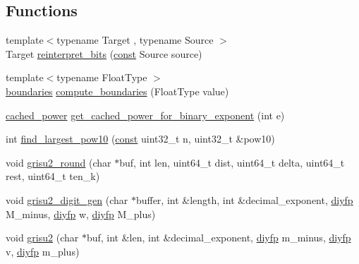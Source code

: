 \subsection*{Functions}
\begin{DoxyCompactItemize}
\item 
{\footnotesize template$<$typename Target , typename Source $>$ }\\Target \hyperlink{namespacenlohmann_1_1detail_1_1dtoa__impl_a1c5d30eb51e5e994a3f48bde104d2ce8}{reinterpret\+\_\+bits} (\hyperlink{functions__c_8js_afacfd9c985d225bb07483b887a801b6f}{const} Source source)
\item 
{\footnotesize template$<$typename Float\+Type $>$ }\\\hyperlink{structnlohmann_1_1detail_1_1dtoa__impl_1_1boundaries}{boundaries} \hyperlink{namespacenlohmann_1_1detail_1_1dtoa__impl_a22b6e37654ac93c6d0d9c06ec1bf5ded}{compute\+\_\+boundaries} (Float\+Type value)
\item 
\hyperlink{structnlohmann_1_1detail_1_1dtoa__impl_1_1cached__power}{cached\+\_\+power} \hyperlink{namespacenlohmann_1_1detail_1_1dtoa__impl_adbf329a18c5cf854a3477327afd2200b}{get\+\_\+cached\+\_\+power\+\_\+for\+\_\+binary\+\_\+exponent} (int e)
\item 
int \hyperlink{namespacenlohmann_1_1detail_1_1dtoa__impl_a264df2b5a7e19b864859161f3501155e}{find\+\_\+largest\+\_\+pow10} (\hyperlink{functions__c_8js_afacfd9c985d225bb07483b887a801b6f}{const} uint32\+\_\+t n, uint32\+\_\+t \&pow10)
\item 
void \hyperlink{namespacenlohmann_1_1detail_1_1dtoa__impl_a9e66e6d0f072aa4fc0627bffc5b1cbd8}{grisu2\+\_\+round} (char $\ast$buf, int len, uint64\+\_\+t dist, uint64\+\_\+t delta, uint64\+\_\+t rest, uint64\+\_\+t ten\+\_\+k)
\item 
void \hyperlink{namespacenlohmann_1_1detail_1_1dtoa__impl_a9b899c72b0e1e3dd46d75c2b4e6bcdfb}{grisu2\+\_\+digit\+\_\+gen} (char $\ast$buffer, int \&length, int \&decimal\+\_\+exponent, \hyperlink{structnlohmann_1_1detail_1_1dtoa__impl_1_1diyfp}{diyfp} M\+\_\+minus, \hyperlink{structnlohmann_1_1detail_1_1dtoa__impl_1_1diyfp}{diyfp} w, \hyperlink{structnlohmann_1_1detail_1_1dtoa__impl_1_1diyfp}{diyfp} M\+\_\+plus)
\item 
void \hyperlink{namespacenlohmann_1_1detail_1_1dtoa__impl_a05b681dcb8569b9784c6dccfadb01633}{grisu2} (char $\ast$buf, int \&len, int \&decimal\+\_\+exponent, \hyperlink{structnlohmann_1_1detail_1_1dtoa__impl_1_1diyfp}{diyfp} m\+\_\+minus, \hyperlink{structnlohmann_1_1detail_1_1dtoa__impl_1_1diyfp}{diyfp} v, \hyperlink{structnlohmann_1_1detail_1_1dtoa__impl_1_1diyfp}{diyfp} m\+\_\+plus)

\end{DoxyCompactItemize}
